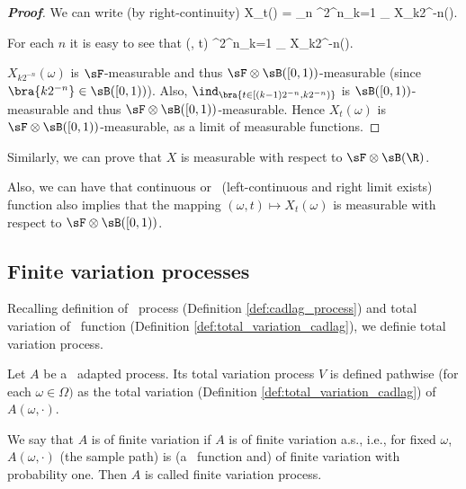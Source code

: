 \begin{proof}[\bf Proof]
We can write (by right-continuity)
\be
X_t(\omega) = \lim_{n\to \infty} \sum^{2^n}_{k=1} \ind_{\bra{t \in [(k-1)2^{-n},k2^{-n})}} X_{k2^{-n}}(\omega).
\ee

For each $n$ it is easy to see that
\be
(\omega, t) \mapsto \sum^{2^n}_{k=1} \ind_{\bra{t \in [(k-1)2^{-n},k2^{-n})}} X_{k2^{-n}}(\omega).
\ee

$X_{k2^{-n}}(\omega)$ is $\sF$-measurable and thus $\sF\otimes \sB([0,1))$-measurable (since $\bra{k2^{-n}} \in \sB([0,1))$). Also, $\ind_{\bra{t \in [(k-1)2^{-n},k2^{-n})}}$ is $\sB([0,1))$-measurable and thus $\sF\otimes \sB([0,1))$-measurable. Hence $X_t(\omega)$ is $\sF\otimes \sB([0, 1))$-measurable, as a limit of measurable
functions.
\end{proof}


\begin{remark}
Similarly, we can prove that $X$ is measurable with respect to $\sF\otimes \sB(\R)$.

Also, we can have that continuous or \ladcag\ (left-continuous and right limit exists) function also implies that the mapping $(\omega, t) \mapsto X_t(\omega)$ is measurable with respect to $\sF\otimes \sB([0, 1))$.
\end{remark}

\subsection{Finite variation processes}

Recalling definition of \cadlag\ process (Definition \ref{def:cadlag_process}) and total variation of \cadlag\ function (Definition \ref{def:total_variation_cadlag}), we definie total variation process.

\begin{definition}\label{def:total_variation_process}
Let $A$ be a \cadlag\ adapted process. Its total variation process $V$ is defined pathwise (for each $\omega \in \Omega)$ as the total variation (Definition \ref{def:total_variation_cadlag}) of $A(\omega, \cdot)$.

We say that $A$ is of finite variation if $A$ is of finite variation a.s., i.e., for fixed $\omega$, $A(\omega, \cdot)$ (the sample path) is (a \cadlag\ function and) of finite variation with probability one. %
Then $A$ is called finite variation process.
\end{definition}

